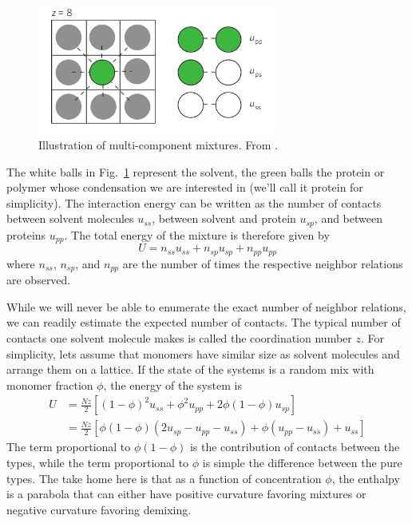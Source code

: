 \begin{figure}[tb]
	\centering
	\includegraphics[width=0.7\textwidth]{figures/Brangwynne_interactions.png}
	\caption{Illustration of multi-component mixtures. From \citet{brangwynne_polymer_2015}.}
	\label{fig:multi_component_mixtures}
\end{figure}

The white balls in Fig.~\ref{fig:multi_component_mixtures} represent the solvent, the green balls the protein or polymer whose condensation we are interested in (we'll call it protein for simplicity).
The interaction energy can be written as the number of contacts between solvent molecules $u_{ss}$, between solvent and protein $u_{sp}$, and between proteins $u_{pp}$.
The total energy of the mixture is therefore given by
\begin{equation}
	U = n_{ss}u_{ss} + n_{sp}u_{sp} + n_{pp}u_{pp}
\end{equation}
where $n_{ss}$, $n_{sp}$, and $n_{pp}$ are the number of times the respective neighbor relations are observed.

While we will never be able to enumerate the exact number of neighbor relations, we can readily estimate the expected number of contacts.
The typical number of contacts one solvent molecule makes is called the coordination number $z$.
For simplicity, lets assume that monomers have similar size as solvent molecules and arrange them on a lattice.
If the state of the systems is a random mix with monomer fraction $\phi$, the energy of the system is
\begin{equation}
\begin{split}
U &= \frac{N z}{2} \left[(1-\phi)^2 u_{ss} + \phi^2 u_{pp} + 2\phi(1-\phi)u_{sp}\right] \\
&= \frac{N z}{2}\left[\phi(1-\phi)(2u_{sp} - u_{pp}-u_{ss}) + \phi(u_{pp}-u_{ss}) + u_{ss}\right]
\end{split}
\end{equation}
The term proportional to $\phi(1-\phi)$ is the contribution of contacts between the types, while the term proportional to $\phi$ is simple the difference between the pure types.
The take home here is that as a function of concentration $\phi$, the enthalpy is a parabola that can either have positive curvature favoring mixtures or negative curvature favoring demixing.

